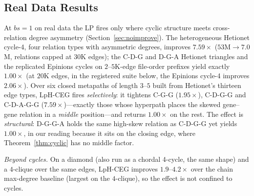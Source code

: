 \documentclass[sigconf, nonacm, acmthm=false]{acmart}
\begin{document}
\subsection{Real Data Results}
\label{sec:realdata}

At $bs{=}1$ on real data the LP fires only where cyclic structure meets
cross-relation degree asymmetry (Section~\ref{sec:noimprove}). The
heterogeneous Hetionet cycle-4, four relation types with asymmetric
degrees, improves $7.59\times$ ($53$M${\to}7.0$M, relations capped at
$30$K edges); the C-D-G and D-G-A Hetionet triangles and the replicated Epinions
cycles on $2$--$5$K-edge file-order prefixes yield exactly $1.00\times$ (at $20$K
edges, in the registered suite below, the Epinions cycle-4 improves $2.06\times$).
Over six closed metapaths of length $3$--$5$
built from Hetionet's thirteen edge types, LpH-CEG fires
\emph{selectively}: it tightens C-G-G
($1.95\times$), C-D-G-G and C-D-A-G-G ($7.59\times$)---exactly those
whose hyperpath places the skewed gene--gene relation in a \emph{middle}
position---and returns $1.00\times$ on the rest. The effect is
\emph{structural}: D-G-G-A holds the same high-skew relation as C-D-G-G
yet yields $1.00\times$, in our reading because it sits on the closing edge, where Theorem~\ref{thm:cyclic} has no middle factor.

\emph{Beyond cycles.} On a diamond (also run as a chordal 4-cycle, the same shape) and a $4$-clique over the same edges, LpH-CEG improves $1.9$--$4.2\times$ over the chain max-degree baseline (largest on the $4$-clique), so the effect is not confined to cycles.
\end{document}
